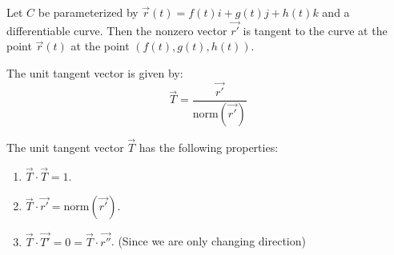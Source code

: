 \documentclass[11pt]{article}
\begin{document}
\begin{definition}
    Let $C$ be parameterized by $\vec{r}(t) = f(t)i + g(t)j + h(t)k$ and a differentiable curve. Then the nonzero vector $\vec{r'}$ is tangent to the curve at the point $\vec{r}(t)$ at the point $(f(t), g(t), h(t))$.
\end{definition}
\begin{definition}
    The unit tangent vector is given by:
    \begin{equation}
        \vec{T} = \frac{\vec{r'}}{\text{norm}({\vec{r'}})}
    \end{equation}
\end{definition}
\begin{theorem}
    The unit tangent vector $\vec{T}$ has the following properties:
    \begin{enumerate}
        \item $\vec{T} \cdot \vec{T} = 1$.
        \item $\vec{T} \cdot \vec{r'} = \text{norm}({\vec{r'}})$.
        \item $\vec{T} \cdot \vec{T'} = 0 = \vec{T} \cdot \vec{r''}$. (Since we are only changing direction)
    \end{enumerate}
\end{theorem}
\end{document}
